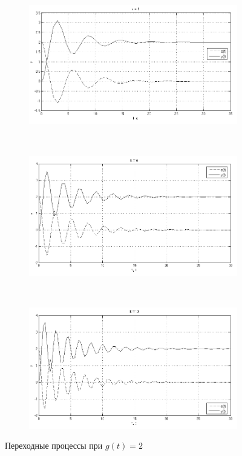 \documentclass[a4paper, 11pt, russian]{article}
\begin{document}
    \begin{figure}[hp]
        \begin{subfigure}[h]{1in}
            \centering
            \includegraphics[scale = 0.7]{constInput1ast1k.png}
        \end{subfigure}\\
        \begin{subfigure}[h]{1in}
            \centering
            \includegraphics[scale = 0.7]{constInput1ast5k.png}
        \end{subfigure}\\
        \begin{subfigure}[h]{1in}
            \centering
            \includegraphics[scale = 0.7]{constInput1ast10k.png}
        \end{subfigure}
        \caption{Переходные процессы при $g(t) = 2$}
    \end{figure}
    \vspace{1.5cm}
\end{document}
